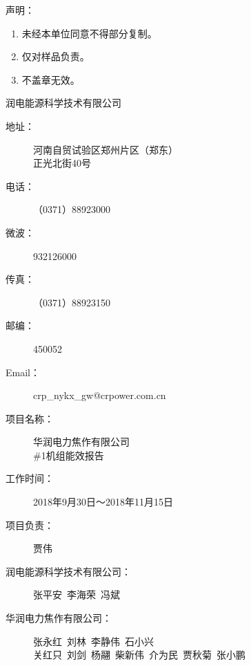 \documentclass[a4paper, 11pt]{article}
\begin{document}
\thispagestyle{empty}
\setcounter{page}{0}
\pagestyle{main}    %
\LARGE{声明：}
\begin{enumerate}
    \item  未经本单位同意不得部分复制。
    \item  仅对样品负责。
    \item  不盖章无效。
\end{enumerate}
\parbox[c][200pt][t]{30pt}{}
\begin{flushright}
    \parbox[c][100pt][l]{300pt}{
        润电能源科学技术有限公司
        \begin{description}
            \item[地址：]河南自贸试验区郑州片区（郑东）\\
						        正光北街40号
            \item[电话：]（0371）88923000
            \item[微波：]932126000
            \item[传真：]（0371）88923150
            \item[邮编：]450052
            \item[Email：]crp\_nykx\_gw@crpower.com.cn
        \end{description}
    }
\end{flushright}
\newpage
\begin{description}
    \item[项目名称：] \parbox[t]{40em}{华润电力焦作有限公司\\\#1机组能效报告}
    \item[工作时间：] 2018年9月30日～2018年11月15日
    \item[项目负责：] 贾伟
    \item[润电能源科学技术有限公司：]张平安\ 李海荣\ 冯斌
    \item[华润电力焦作有限公司：]\parbox[t]{15em}{张永红\ 刘林\ 李静伟\ 石小兴\\ 关红只\ 刘剑\ 杨翮\ 柴新伟\ 介为民\ 贾秋菊\ 张小鹏}
\end{description}
\end{document}
